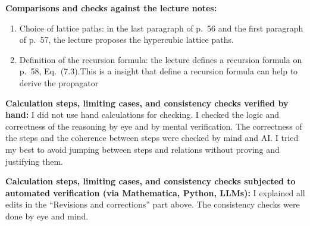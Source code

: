 \documentclass[12pt]{article}
\begin{document}
\medskip
\noindent\textbf{Comparisons and checks against the lecture notes:}
\begin{enumerate}[label=\arabic*.]
    \item Choice of lattice paths: in the last paragraph of p.~56 and the first paragraph of p.~57, the lecture proposes the hypercubic lattice paths.
    \item Definition of the recursion formula: the lecture defines a recursion formula on p.~58, Eq.~(7.3).This is a insight that define a recursion formula can help to derive the propagator 
\end{enumerate}

\medskip
\noindent\textbf{Calculation steps, limiting cases, and consistency checks verified by hand:}
I did not use hand calculations for checking. I checked the logic and correctness of the reasoning by eye and by mental verification. The correctness of the steps and the coherence between steps were checked by mind and AI. I tried my best to avoid jumping between steps and relations without proving and justifying them.

\medskip
\noindent\textbf{Calculation steps, limiting cases, and consistency checks subjected to automated verification (via Mathematica, Python, LLMs):}
I explained all edits in the ``Revisions and corrections'' part above. The consistency checks were done by eye and mind.
\end{document}
